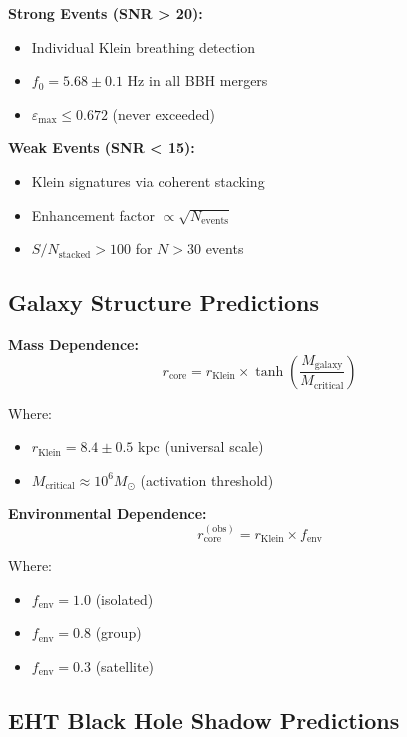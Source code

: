 \documentclass[12pt,a4paper]{article}
\begin{document}
\textbf{Strong Events (SNR > 20):}
\begin{itemize}
\item Individual Klein breathing detection
\item $f_0 = 5.68 \pm 0.1$ Hz in all BBH mergers
\item $\varepsilon_{\max} \leq 0.672$ (never exceeded)
\end{itemize}

\textbf{Weak Events (SNR < 15):}
\begin{itemize}
\item Klein signatures via coherent stacking
\item Enhancement factor $\propto \sqrt{N_{\text{events}}}$
\item $S/N_{\text{stacked}} > 100$ for $N > 30$ events
\end{itemize}

\subsection{Galaxy Structure Predictions}

\textbf{Mass Dependence:}
\begin{equation}
r_{\text{core}} = r_{\text{Klein}} \times \tanh\left(\frac{M_{\text{galaxy}}}{M_{\text{critical}}}\right)
\end{equation}

Where:
\begin{itemize}
\item $r_{\text{Klein}} = 8.4 \pm 0.5$ kpc (universal scale)
\item $M_{\text{critical}} \approx 10^6 M_\odot$ (activation threshold)
\end{itemize}

\textbf{Environmental Dependence:}
\begin{equation}
r_{\text{core}}^{(\text{obs})} = r_{\text{Klein}} \times f_{\text{env}}
\end{equation}

Where:
\begin{itemize}
\item $f_{\text{env}} = 1.0$ (isolated)
\item $f_{\text{env}} = 0.8$ (group)
\item $f_{\text{env}} = 0.3$ (satellite)
\end{itemize}

\subsection{EHT Black Hole Shadow Predictions}
\end{document}
